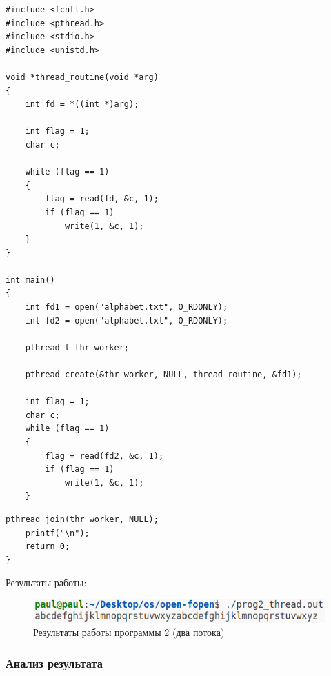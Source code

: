 \begin{center}
	\captionsetup{justification=raggedright,singlelinecheck=off}

	\begin{lstlisting}[label=lst:prog2-th-1,caption=Программа 2 --- два потока --- часть 1]
#include <fcntl.h>
#include <pthread.h>
#include <stdio.h>
#include <unistd.h>

void *thread_routine(void *arg)
{
    int fd = *((int *)arg);

    int flag = 1;
    char c;

    while (flag == 1)
    {
        flag = read(fd, &c, 1);
        if (flag == 1)
            write(1, &c, 1);
    }
}

int main()
{
    int fd1 = open("alphabet.txt", O_RDONLY);
    int fd2 = open("alphabet.txt", O_RDONLY);

    pthread_t thr_worker;

    pthread_create(&thr_worker, NULL, thread_routine, &fd1);

    int flag = 1;
    char c;
    while (flag == 1)
    {
        flag = read(fd2, &c, 1);
        if (flag == 1)
            write(1, &c, 1);
    }
	\end{lstlisting}
\end{center}

\clearpage

\begin{center}
	\captionsetup{justification=raggedright,singlelinecheck=off}

	\begin{lstlisting}[label=lst:prog2-th-2,caption=Программа 2 --- два потока --- часть 2]
    pthread_join(thr_worker, NULL);
    printf("\n");
    return 0;
}
	\end{lstlisting}
\end{center}

Результаты работы:

\begin{figure}[h]
	\centering
	\captionsetup{justification=centering}
	\includegraphics[width=150mm]{img/prog2_thread.png}
	\caption{Результаты работы программы 2 (два потока)}
	\label{fig:prog-2-th-result}
\end{figure}

\subsubsection*{Анализ результата}


